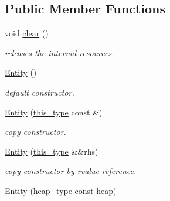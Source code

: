 \subsection*{Public Member Functions}
\begin{DoxyCompactItemize}
\item 
\hypertarget{classhryky_1_1ip_1_1vf_1_1_entity_a7a376ae80341a5e1978036c787791ac8}{void \hyperlink{classhryky_1_1ip_1_1vf_1_1_entity_a7a376ae80341a5e1978036c787791ac8}{clear} ()}\label{classhryky_1_1ip_1_1vf_1_1_entity_a7a376ae80341a5e1978036c787791ac8}

\begin{DoxyCompactList}\small\item\em releases the internal resources. \end{DoxyCompactList}\item 
\hypertarget{classhryky_1_1ip_1_1vf_1_1_entity_a61025534537475c910dc8d06ef7451f7}{\hyperlink{classhryky_1_1ip_1_1vf_1_1_entity_a61025534537475c910dc8d06ef7451f7}{Entity} ()}\label{classhryky_1_1ip_1_1vf_1_1_entity_a61025534537475c910dc8d06ef7451f7}

\begin{DoxyCompactList}\small\item\em default constructor. \end{DoxyCompactList}\item 
\hypertarget{classhryky_1_1ip_1_1vf_1_1_entity_a5a3dbf4848568a2872e4a3a81a790684}{\hyperlink{classhryky_1_1ip_1_1vf_1_1_entity_a5a3dbf4848568a2872e4a3a81a790684}{Entity} (\hyperlink{classhryky_1_1ip_1_1vf_1_1_entity_adf2e2de606d79343c1f1a1aa016d9abd}{this\-\_\-type} const \&)}\label{classhryky_1_1ip_1_1vf_1_1_entity_a5a3dbf4848568a2872e4a3a81a790684}

\begin{DoxyCompactList}\small\item\em copy constructor. \end{DoxyCompactList}\item 
\hypertarget{classhryky_1_1ip_1_1vf_1_1_entity_ad2c30954ca29f51dbe1c68751e5b842d}{\hyperlink{classhryky_1_1ip_1_1vf_1_1_entity_ad2c30954ca29f51dbe1c68751e5b842d}{Entity} (\hyperlink{classhryky_1_1ip_1_1vf_1_1_entity_adf2e2de606d79343c1f1a1aa016d9abd}{this\-\_\-type} \&\&rhs)}\label{classhryky_1_1ip_1_1vf_1_1_entity_ad2c30954ca29f51dbe1c68751e5b842d}

\begin{DoxyCompactList}\small\item\em copy constructor by rvalue reference. \end{DoxyCompactList}\item 
\hypertarget{classhryky_1_1ip_1_1vf_1_1_entity_a39bab656b3655ae446ea38cc596326f8}{\hyperlink{classhryky_1_1ip_1_1vf_1_1_entity_a39bab656b3655ae446ea38cc596326f8}{Entity} (\hyperlink{classhryky_1_1memory_1_1heap_1_1_base}{heap\-\_\-type} const heap)}\label{classhryky_1_1ip_1_1vf_1_1_entity_a39bab656b3655ae446ea38cc596326f8}


\end{DoxyCompactItemize}
